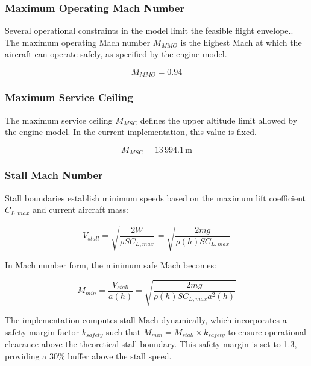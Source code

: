 \subsubsection{Maximum Operating Mach Number}
Several operational constraints in the model limit the feasible flight envelope.. The maximum operating Mach number \(M_{MMO}\) is the highest Mach at which the aircraft can operate safely, as specified by the engine model.

\[
M_{MMO} = 0.94
\]

\subsubsection{Maximum Service Ceiling}
The maximum service ceiling \(M_{MSC}\) defines the upper altitude limit allowed by the engine model. In the current implementation, this value is fixed.

\[
M_{MSC} = 13\,994.1 \,\text{m}
\]


\subsubsection{Stall Mach Number} 
Stall boundaries establish minimum speeds based on the maximum lift coefficient $C_{L,max}$ and current aircraft mass:

\begin{equation}
V_{stall} = \sqrt{\frac{2W}{\rho S C_{L,max}}} = \sqrt{\frac{2mg}{\rho(h) S C_{L,max}}}
\end{equation}

In Mach number form, the minimum safe Mach becomes:

\begin{equation}
M_{min} = \frac{V_{stall}}{a(h)} = \sqrt{\frac{2mg}{\rho(h) S C_{L,max} a^2(h)}}
\end{equation}

The implementation computes stall Mach dynamically, which incorporates a safety margin factor $k_{safety}$ such that $M_{min} = M_{stall} \times k_{safety}$ to ensure operational clearance above the theoretical stall boundary. This safety margin is set to 1.3, providing a 30\% buffer above the stall speed.





